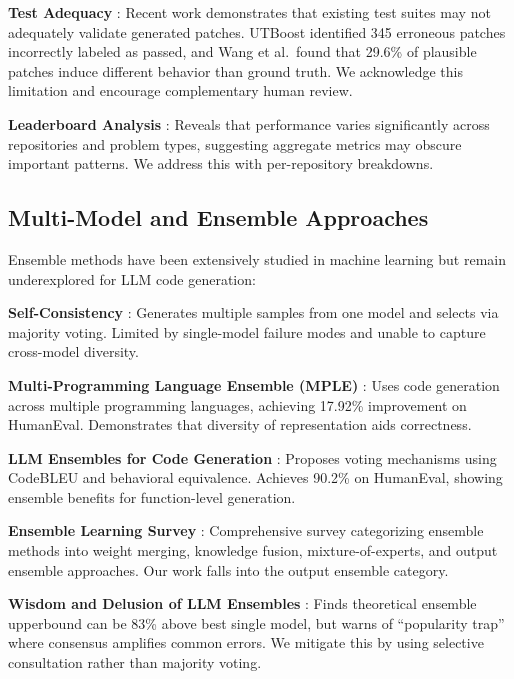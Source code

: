 \documentclass[11pt,a4paper]{article}
\begin{document}
\textbf{Test Adequacy} \citep{yu2025utboost,wang2025patchcorrectness}: Recent work demonstrates that existing test suites may not adequately validate generated patches. UTBoost identified 345 erroneous patches incorrectly labeled as passed, and Wang et al.\ found that 29.6\% of plausible patches induce different behavior than ground truth. We acknowledge this limitation and encourage complementary human review.

\textbf{Leaderboard Analysis} \citep{martinez2025dissecting}: Reveals that performance varies significantly across repositories and problem types, suggesting aggregate metrics may obscure important patterns. We address this with per-repository breakdowns.

\subsection{Multi-Model and Ensemble Approaches}

Ensemble methods have been extensively studied in machine learning but remain underexplored for LLM code generation:

\textbf{Self-Consistency} \citep{wang2023selfconsistency}: Generates multiple samples from one model and selects via majority voting. Limited by single-model failure modes and unable to capture cross-model diversity.

\textbf{Multi-Programming Language Ensemble (MPLE)} \citep{xue2024mple}: Uses code generation across multiple programming languages, achieving 17.92\% improvement on HumanEval. Demonstrates that diversity of representation aids correctness.

\textbf{LLM Ensembles for Code Generation} \citep{mahmud2025ensembles}: Proposes voting mechanisms using CodeBLEU and behavioral equivalence. Achieves 90.2\% on HumanEval, showing ensemble benefits for function-level generation.

\textbf{Ensemble Learning Survey} \citep{ashiga2025ensemble}: Comprehensive survey categorizing ensemble methods into weight merging, knowledge fusion, mixture-of-experts, and output ensemble approaches. Our work falls into the output ensemble category.

\textbf{Wisdom and Delusion of LLM Ensembles} \citep{vallecillos2025wisdom}: Finds theoretical ensemble upperbound can be 83\% above best single model, but warns of ``popularity trap'' where consensus amplifies common errors. We mitigate this by using selective consultation rather than majority voting.
\end{document}
